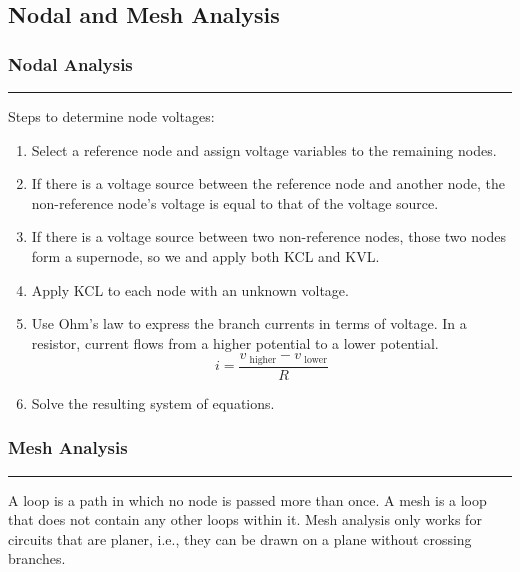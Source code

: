 \documentclass{article}
\begin{document}
    \pagebreak
    \begin{center}
        \subsection*{Nodal and Mesh Analysis}
    \end{center}

    \medskip
    \subsubsection*{Nodal Analysis}
    \vspace{-1em}
    \rule{\linewidth}{0.1mm}

    \vspace{.2em}\noindent
    Steps to determine node voltages:

    \begin{enumerate}[label=\arabic*.]
        \item Select a reference node and assign voltage variables to the remaining nodes.
        \item If there is a voltage source between the reference node and another node, the non-reference node's voltage is equal to that of the voltage source.
        \item If there is a voltage source between two non-reference nodes, those two nodes form a supernode, so we and apply both KCL and KVL.
        \item Apply KCL to each node with an unknown voltage.
        \item Use Ohm's law to express the branch currents in terms of voltage.
        In a resistor, current flows from a higher potential to a lower potential.
        \[
            i = \frac{v_{\text{ higher}} - v_{\text{ lower}}}{R}
        \]
        \item Solve the resulting system of equations.
    \end{enumerate}

    \smallskip
    \subsubsection*{Mesh Analysis}
    \vspace{-1em}
    \rule{\linewidth}{0.1mm}

    \smallskip\noindent
    A loop is a path in which no node is passed more than once.
    A mesh is a loop that does not contain any other loops within it.
    Mesh analysis only works for circuits that are planer, i.e., they can be drawn on a plane without crossing branches.
\end{document}
